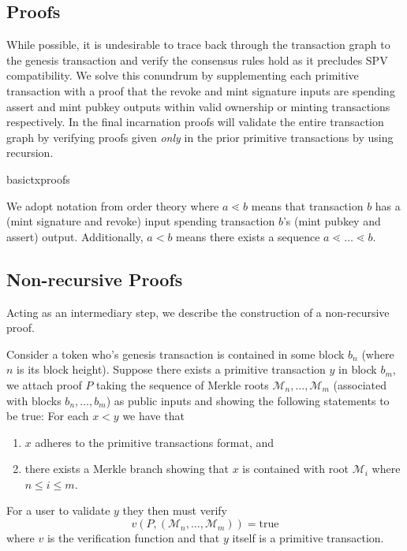 \documentclass[9pt,oneside]{amsart}
\begin{document}
\begin{multicols}{2}
\section{Proofs}
While possible, it is undesirable to trace back through the transaction graph to the genesis transaction and verify the consensus rules hold as it precludes SPV compatibility. We solve this conundrum by supplementing each primitive transaction with a proof that the revoke and mint signature inputs are spending assert and mint pubkey outputs within valid ownership or minting transactions respectively. In the final incarnation proofs will validate the entire transaction graph by verifying proofs given \emph{only} in the prior primitive transactions by using recursion.

\begin{center}
    {basictxproofs}
\end{center}

We adopt notation from order theory where $a \lessdot b$ means that transaction $b$ has a (mint signature and revoke) input spending transaction $b$'s (mint pubkey and assert) output.  Additionally, $a < b$ means there exists a sequence $a \lessdot \dots \lessdot b$.
\subsection{Non-recursive Proofs}
Acting as an intermediary step, we describe the construction of a non-recursive proof.

Consider a token who's genesis transaction is contained in some block $b_{n}$ (where $n$ is its block height). Suppose there exists a primitive transaction $y$ in block $b_{m}$, we attach proof $P$ taking the sequence of Merkle roots $\mathcal{M}_{n}, \dots, \mathcal{M}_{m}$ (associated with blocks $b_{n}, \dots, b_{m}$) as public inputs and showing the following statements to be true:
For each $x < y$ we have that
\begin{enumerate}
    \item $x$ adheres to the primitive transactions format, and
    \item there exists a Merkle branch showing that $x$ is contained with root $\mathcal{M}_{i}$ where $n \leq i \leq m$.
\end{enumerate}

For a user to validate $y$ they then must verify
\[v(P, (\mathcal{M}_{n}, \dots, \mathcal{M}_{m})) = \text{true}\] 
where $v$ is the verification function and that $y$ itself is a primitive transaction.


\end{multicols}
\end{document}
